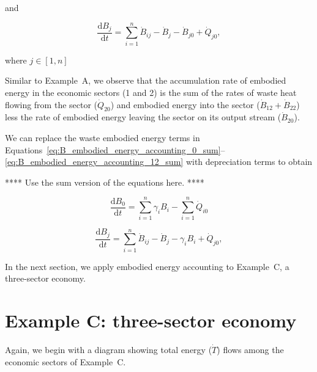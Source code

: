 \noindent and

\begin{equation} \label{eq:B_embodied_energy_accounting_12_sum}
	\frac{\mathrm{d}B_{j}}{\mathrm{d}t} 
	= \sum\limits_{i=1}^n\dot{B}_{ij} 
	- \dot{B}_{j}
	- \dot{B}_{j0} 
	+ \dot{Q}_{j0},
\end{equation}

\noindent where $j \in [1, n]$

Similar to Example~A, we observe that the accumulation rate 
of embodied energy in the economic sectors (1 and 2) 
is the sum of the rates of waste heat flowing from the sector 
($\dot{Q}_{20}$) and embodied energy into the sector 
($\dot{B}_{12} + \dot{B}_{22}$) 
less the rate of embodied energy leaving the sector 
on its output stream ($\dot{B}_{20}$).

We can replace the waste embodied energy terms in 
Equations~\ref{eq:B_embodied_energy_accounting_0_sum}--\ref{eq:B_embodied_energy_accounting_12_sum}
with depreciation terms to obtain

**** Use the sum version of the equations here. ****

\begin{equation} \label{eq:B_embodied_energy_accounting_0_with_depreciation}
	\frac{\mathrm{d}B_{0}}{\mathrm{d}t} 
	= \sum\limits_{i=1}^n \gamma_{i}B_{i} 
	- \sum\limits_{i=1}^n\dot{Q}_{i0} 
\end{equation}

\begin{equation} \label{eq:B_embodied_energy_accounting_12_with_depreciation}
	\frac{\mathrm{d}B_{j}}{\mathrm{d}t} 
	= \sum\limits_{i=1}^n\dot{B}_{ij} 
	- \dot{B}_{j}
	- \gamma_{i} B_{i}
	+ \dot{Q}_{j0},
\end{equation}

In the next section, we apply embodied energy accounting to 
Example~C, a three-sector economy.


\section{Example C: three-sector economy}

Again, we begin with a diagram showing total energy ($\dot{T}$) flows
among the economic sectors of Example~C.

